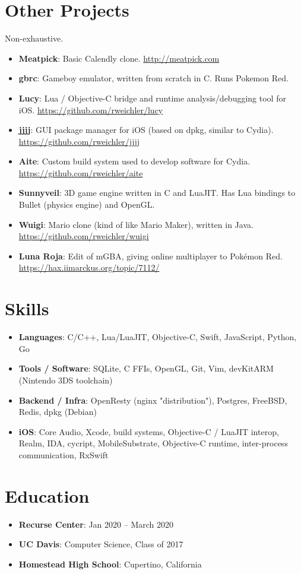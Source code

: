 \documentclass[letterpaper,11pt]{article}
\newcommand{\resumeItem}[2]{
  \item\small{
    \textbf{#1}{: #2 \vspace{-2.5pt}}
  }
}
\newcommand{\resumeSubItem}[2]{\resumeItem{#1}{#2}\vspace{-4.5pt}}
\newcommand{\resumeSubHeadingListStart}{\begin{itemize}[leftmargin=*]}
\newcommand{\resumeSubHeadingListEnd}{\end{itemize}}
\begin{document}
\section{Other Projects}
    Non-exhaustive.\vspace{-2pt}
  \resumeSubHeadingListStart
    \resumeSubItem{Meatpick}
      {Basic Calendly clone. \href{http://meatpick.com}{http://meatpick.com}}
    \resumeSubItem{gbrc}
      {Gameboy emulator, written from scratch in C. Runs Pokemon Red.}
    \resumeSubItem{Lucy}
      {Lua / Objective-C bridge and runtime analysis/debugging tool for iOS. \href{https://github.com/rweichler/lucy}{https://github.com/rweichler/lucy}}
    \resumeSubItem{jjjj}
      {GUI package manager for iOS (based on dpkg, similar to Cydia).  \href{https://github.com/rweichler/jjjj}{https://github.com/rweichler/jjjj}}
    \resumeSubItem{Aite}
      {Custom build system used to develop software for Cydia. \href{https://github.com/rweichler/aite}{https://github.com/rweichler/aite}}
    \resumeSubItem{Sunnyveil}
      {3D game engine written in C and LuaJIT. Has Lua bindings to Bullet (physics engine) and OpenGL.}
    \resumeSubItem{Wuigi}
      {Mario clone (kind of like Mario Maker), written in Java. \href{https://github.com/rweichler/wuigi}{https://github.com/rweichler/wuigi}}
    \resumeSubItem{Luna Roja}
      {Edit of mGBA, giving online multiplayer to Pok\'emon Red.  \href{https://hax.iimarckus.org/topic/7112/}{https://hax.iimarckus.org/topic/7112/}}
  \resumeSubHeadingListEnd

  
\section{Skills}
  \resumeSubHeadingListStart
        \resumeSubItem{Languages}
            {C/C++, Lua/LuaJIT, Objective-C, Swift, JavaScript, Python, Go}
        \resumeSubItem{Tools / Software}
            {SQLite, C FFIs, OpenGL, Git, Vim, devKitARM (Nintendo 3DS toolchain)}
        \resumeSubItem{Backend / Infra}
            {OpenResty (nginx "distribution"), Postgres, FreeBSD, Redis, dpkg (Debian)}
        \resumeSubItem{iOS}
            {Core Audio, Xcode, build systems, Objective-C / LuaJIT interop, Realm, IDA, cycript, MobileSubstrate, Objective-C runtime, inter-process communication, RxSwift}
  \resumeSubHeadingListEnd


\section{Education}
  \resumeSubHeadingListStart
    \resumeSubItem
      {Recurse Center}{Jan 2020 -- March 2020}
    \resumeSubItem
      {UC Davis}{Computer Science, Class of 2017}
    \resumeSubItem
      {Homestead High School}{Cupertino, California}
  \resumeSubHeadingListEnd
\end{document}
